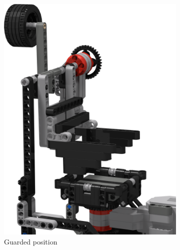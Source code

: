 \documentclass{report}
\begin{document}
	\begin{figure}[H]
		\centering
		\begin{subfigure}[b]{0.22193\textwidth}
			\includegraphics[width=\textwidth]{Resources/Images/rdrXMoveArmV1_1.png}
			\caption{Guarded position}
			\label{fig:rdrXMoveArmV1_1}
		\end{subfigure}
		\hspace{10mm}
		\begin{subfigure}[b]{0.22\textwidth}

\end{subfigure}
\end{figure}
\end{document}
